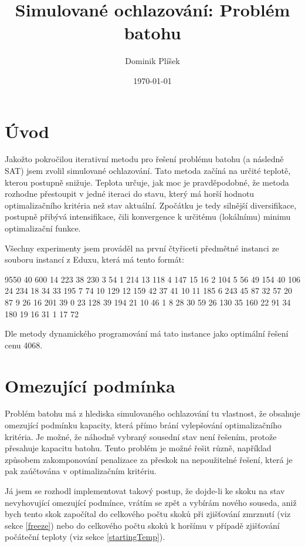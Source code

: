\documentclass[12pt,a4paper]{article}
\begin{document}
\title{Simulované ochlazování: Problém batohu}
\author{Dominik Plíšek}
\date{\dmyyyydate\today}
\maketitle

\tableofcontents

\section*{Úvod}

Jakožto pokročilou iterativní metodu pro řešení problému batohu (a následně SAT) jsem zvolil simulované ochlazování. Tato metoda začíná na určité teplotě, kterou postupně snižuje. Teplota určuje, jak moc je pravděpodobné, že metoda rozhodne přestoupit v jedné iteraci do stavu, který má horší hodnotu optimalizačního kritéria než stav aktuální. Zpočátku je tedy silnější diversifikace, postupně přibývá intensifikace, čili konvergence k určitému (lokálnímu) minimu optimalizační funkce.

Všechny experimenty jsem prováděl na první čtyřiceti předmětné instanci ze souboru instancí z Eduxu, která má tento formát:

9550 40 600 14 223 38 230 3 54 1 214 13 118 4 147 15 16 2 104 5 56 49 154 40 106 24 234 18 34 33 195 7 74 10 129 12 159 42 37 41 10 11 185 6 243 45 87 32 57 20 87 9 26 16 201 39 0 23 128 39 194 21 10 46 1 8 28 30 59 26 130 35 160 22 91 34 180 19 16 31 1 17 72

Dle metody dynamického programování má tato instance jako optimální řešení cenu 4068.

\section{Omezující podmínka}

Problém batohu má z hlediska simulovaného ochlazování tu vlastnost, že obsahuje omezující podmínku kapacity, která přímo brání vylepšování optimalizačního kritéria. Je možné, že náhodně vybraný sousední stav není řešením, protože přesahuje kapacitu batohu. Tento problém je možné řešit různě, například způsobem zakomponování penalizace za přeskok na nepoužitelné řešení, která je pak zaúčtována v optimalizačním kritériu.

Já jsem se rozhodl implementovat takový postup, že dojde-li ke skoku na stav nevyhovující omezující podmínce, vrátím se zpět a vybírám nového souseda, aniž bych tento skok započítal do celkového počtu skoků při zjišťování zmrznutí (viz sekce \ref{freeze}) nebo do celkového počtu skoků k horšímu v případě zjišťování počáteční teploty (viz sekce \ref{startingTemp}).
\end{document}
